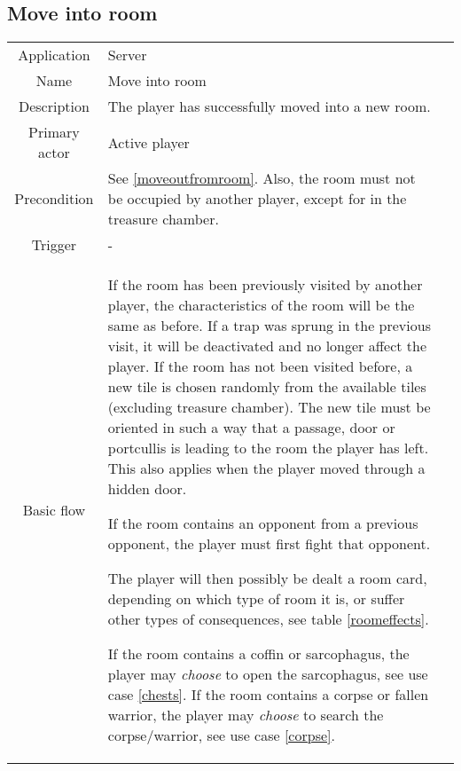 \subsection{Move into room}
\label{moveintoroom}
\begin{tabular}{|c| p{9cm}|c}
\hline
Application & Server \\
Name & Move into room \\
Description & The player has successfully moved into a new room. \\
Primary actor & Active player \\
Precondition & See \ref{moveoutfromroom}. Also, the room must not be occupied by another player, except for in the treasure chamber. \\
Trigger & - \\ \hline
Basic flow & If the room has been previously visited by another player, the characteristics of the room will be the same as before. If a trap was sprung in the previous visit, it will be deactivated and no longer affect the player. If the room has not been visited before, a new tile is chosen randomly from the available tiles (excluding treasure chamber). The new tile must be oriented in such a way that a passage, door or portcullis is leading to the room the player has left. This also applies when the player moved through a hidden door.

If the room contains an opponent from a previous opponent, the player must first fight that opponent.

The player will then possibly be dealt a room card, depending on which type of room it is, or suffer other types of consequences, see table \ref{roomeffects}.

If the room contains a coffin or sarcophagus, the player may \emph{choose} to open the sarcophagus, see use case \ref{chests}. If the room contains a corpse or fallen warrior, the player may \emph{choose} to search the corpse/warrior, see use case \ref{corpse}.\\ \hline
\end{tabular}


